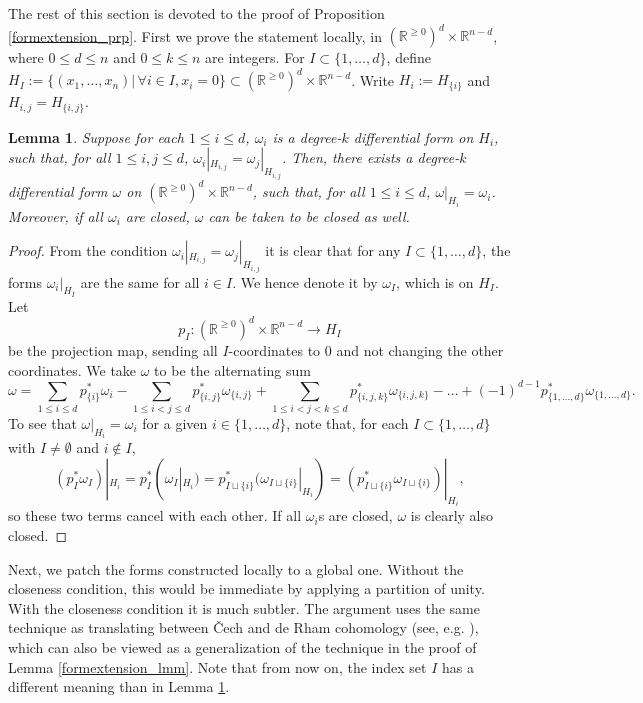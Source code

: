 \documentclass[11pt]{article}
\newtheorem{lmm}[thm]{Lemma}
\theoremstyle{definition}
\theoremstyle{remark}
\def\R{\mathbb{R}}
\begin{document}
\begin{appendices}
The rest of this section is devoted to the proof of Proposition \ref{formextension_prp}.
First we prove the statement locally, in $(\R^{\ge0})^d\times\R^{n-d}$, where $0\le d\le n$ and $0\le k\le n$ are integers. 
For $I\subset\{1,\ldots,d\}$, define $H_I:=\big\{(x_1,\ldots,x_n)\big|\,\forall i\in I, x_i=0\big\}\subset (\R^{\ge0})^d\times\R^{n-d}$. 
Write $H_i:=H_{\{i\}}$ and $H_{i,j}=H_{\{i,j\}}$. 
\begin{lmm}\label{localformpatching_lmm}
Suppose for each $1\le i\le d$, $\omega_i$ is a degree-$k$ differential form on $H_i$, such that, for all $1\le i,j\le d$, $\omega_i|_{H_{i,j}}=\omega_j|_{H_{i,j}}$. 
Then, there exists a degree-$k$ differential form $\omega$ on $(\R^{\ge0})^d\times\R^{n-d}$, such that, for all $1\le i\le d$, $\omega|_{H_i}=\omega_i$. 
Moreover, if all $\omega_i$ are closed, $\omega$ can be taken to be closed as well. 
\end{lmm}
\begin{proof}
From the condition $\omega_i|_{H_{i,j}}=\omega_j|_{H_{i,j}}$ it is clear that for any $I\subset\{1,\ldots,d\}$, the forms $\omega_i|_{H_I}$ are the same for all $i\in I$. We hence denote it by $\omega_I$, which is on $H_I$. %
Let $$p_I:(\R^{\ge0})^d\times\R^{n-d}\longrightarrow H_I$$
be the projection map, sending all $I$-coordinates to 0 and not changing the other coordinates. 
We take $\omega$ to be the alternating sum
$$
\omega=\sum_{1\le i\le d}p_{\{i\}}^*\omega_i
-\sum_{1\le i<j\le d}p_{\{i,j\}}^*\omega_{\{i,j\}}
+\sum_{1\le i<j<k\le d}p_{\{i,j,k\}}^*\omega_{\{i,j,k\}}
-\ldots+(-1)^{d-1}p_{\{1,\ldots,d\}}^*\omega_{\{1,\ldots,d\}}.
$$
To see that $\omega|_{H_i}=\omega_i$ for a given $i\in\{1,\ldots,d\}$, note that, for each $I\subset\{1,\ldots,d\}$ with $I\neq\emptyset$ and $i\notin I$,
$$(p_I^*\omega_I)|_{H_i}=p_I^*(\omega_I|_{H_i})=p_{I\sqcup\{i\}}^*(\omega_{I\sqcup\{i\}}|_{H_i})=(p_{I\sqcup\{i\}}^*\omega_{I\sqcup\{i\}})|_{H_i},$$ so these two terms cancel with each other. 
If all $\omega_i$s are closed, $\omega$ is clearly also closed. 
\end{proof}

Next, we patch the forms constructed locally to a global one. Without the closeness condition, this would be immediate by applying a partition of unity. With the closeness condition it is much subtler. 
The argument uses the same technique as translating between \v{C}ech and de Rham cohomology (see, e.g. \cite{BottTu}), which can also be viewed as a generalization of the technique in the proof of Lemma \ref{formextension_lmm}. 
Note that from now on, the index set $I$ has a different meaning than in Lemma \ref{localformpatching_lmm}. 


\end{appendices}
\end{document}
